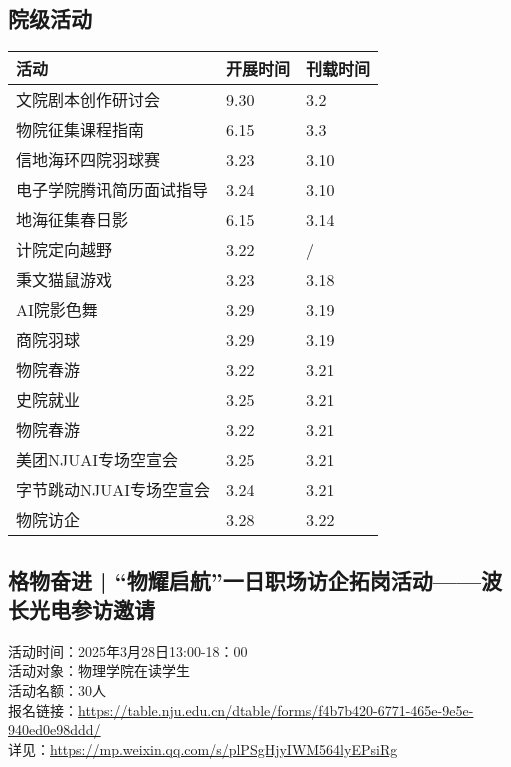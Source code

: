 \documentclass[letterpaper, 12pt]{article}
\begin{document}
\begin{multicols}{2}


\section{院级活动}
\begin{tabular}{|>{\centering\arraybackslash}m{}|m{}|m{}|}
\hline
    活动 & 开展时间 & 刊载时间\\
    \hline\hline
    文院剧本创作研讨会 & 9.30 & 3.2\\
    物院征集课程指南 & 6.15 & 3.3\\
    信地海环四院羽球赛 & 3.23 & 3.10\\
    电子学院腾讯简历面试指导 & 3.24 & 3.10\\
    地海征集春日影 & 6.15 & 3.14\\
    计院定向越野 & 3.22 & / \\
    秉文猫鼠游戏 & 3.23 & 3.18\\
    AI院影色舞 & 3.29 & 3.19\\
    商院羽球 & 3.29 & 3.19\\
    物院春游 & 3.22 & 3.21\\
    史院就业 & 3.25 & 3.21\\
    物院春游 & 3.22 & 3.21\\
    美团NJUAI专场空宣会 & 3.25 & 3.21\\
    字节跳动NJUAI专场空宣会 & 3.24 & 3.21\\
    物院访企 & 3.28 & 3.22\\
    \hline
\end{tabular}

\subsection{格物奋进 | “物耀启航”一日职场访企拓岗活动——波长光电参访邀请}
活动时间：2025年3月28日13:00-18：00
\\活动对象：物理学院在读学生
\\活动名额：30人
\\报名链接：\url{https://table.nju.edu.cn/dtable/forms/f4b7b420-6771-465e-9e5e-940ed0e98ddd/}
\\详见：\url{https://mp.weixin.qq.com/s/plPSgHjyIWM564lyEPsiRg}


\end{multicols}
\end{document}

